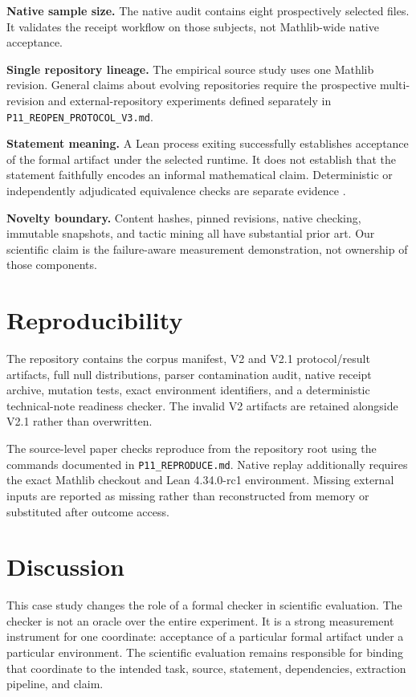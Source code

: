 \documentclass[11pt]{article}
\begin{document}
\textbf{Native sample size.} The native audit contains eight prospectively selected files. It validates the receipt workflow on those subjects, not Mathlib-wide native acceptance.

\textbf{Single repository lineage.} The empirical source study uses one Mathlib revision. General claims about evolving repositories require the prospective multi-revision and external-repository experiments defined separately in \texttt{P11\_REOPEN\_PROTOCOL\_V3.md}.

\textbf{Statement meaning.} A Lean process exiting successfully establishes acceptance of the formal artifact under the selected runtime. It does not establish that the statement faithfully encodes an informal mathematical claim. Deterministic or independently adjudicated equivalence checks are separate evidence \cite{wu2026itpeval}.

\textbf{Novelty boundary.} Content hashes, pinned revisions, native checking, immutable snapshots, and tactic mining all have substantial prior art. Our scientific claim is the failure-aware measurement demonstration, not ownership of those components.

\section{Reproducibility}
The repository contains the corpus manifest, V2 and V2.1 protocol/result artifacts, full null distributions, parser contamination audit, native receipt archive, mutation tests, exact environment identifiers, and a deterministic technical-note readiness checker. The invalid V2 artifacts are retained alongside V2.1 rather than overwritten.

The source-level paper checks reproduce from the repository root using the commands documented in \texttt{P11\_REPRODUCE.md}. Native replay additionally requires the exact Mathlib checkout and Lean 4.34.0-rc1 environment. Missing external inputs are reported as missing rather than reconstructed from memory or substituted after outcome access.

\section{Discussion}
This case study changes the role of a formal checker in scientific evaluation. The checker is not an oracle over the entire experiment. It is a strong measurement instrument for one coordinate: acceptance of a particular formal artifact under a particular environment. The scientific evaluation remains responsible for binding that coordinate to the intended task, source, statement, dependencies, extraction pipeline, and claim.
\end{document}
